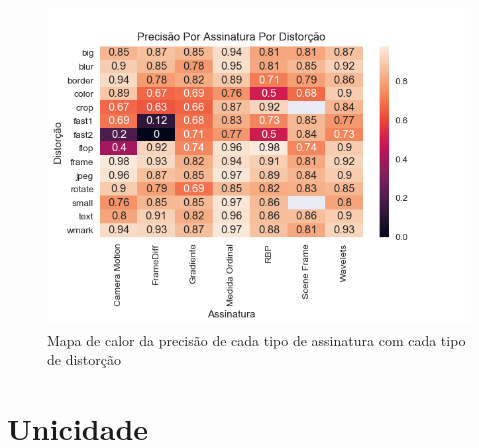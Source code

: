 \begin{figure}[h]
	\centering
	\caption{Mapa de calor da precisão de cada tipo de assinatura com cada tipo de distorção}
	\label{fig:heatmap-precisao}
	\includegraphics[width=\textwidth]{dados/figuras/experimentos/heatmap_final_precisao.png}	
\end{figure}
\section{Unicidade}


